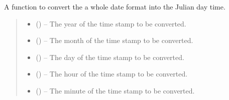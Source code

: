 \documentclass[letterpaper,11pt,english]{sphinxmanual}
\begin{document}

\begin{savenotes}\begin{fulllineitems}
\label{\detokenize{code/opihiexarata.library.conversion:opihiexarata.library.conversion.full_date_to_julian_day}}
\pysigstartsignatures
{}
\pysigstopsignatures
\sphinxAtStartPar
A function to convert the a whole date format into the Julian day time.
\begin{quote}\begin{description}
\begin{itemize}
\item {} 
\sphinxAtStartPar
{} () – The year of the time stamp to be converted.

\item {} 
\sphinxAtStartPar
{} () – The month of the time stamp to be converted.

\item {} 
\sphinxAtStartPar
{} () – The day of the time stamp to be converted.

\item {} 
\sphinxAtStartPar
{} () – The hour of the time stamp to be converted.

\item {} 
\sphinxAtStartPar
{} () – The minute of the time stamp to be converted.


\end{itemize}
\end{description}
\end{quote}
\end{fulllineitems}
\end{savenotes}
\end{document}
